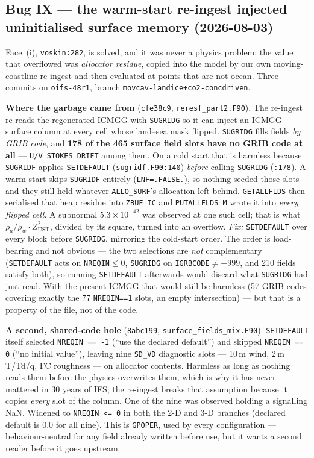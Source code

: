 \documentclass[11pt,a4paper]{article}
\newcommand{\code}[1]{\texttt{\small #1}}
\begin{document}
\subsection{Bug IX --- the warm-start re-ingest injected uninitialised surface memory (2026-08-03)}\label{sec:bug9}

Face~(i), \code{voskin:282}, is solved, and it was never a physics problem: the value that overflowed
was \emph{allocator residue}, copied into the model by our own moving-coastline re-ingest and then
evaluated at points that are not ocean. Three commits on
\code{oifs-48r1}, branch \code{movcav-landice+co2-concdriven}.

\textbf{Where the garbage came from} (\code{cfe38c9}, \code{reresf\_part2.F90}). The re-ingest re-reads
the regenerated ICMGG with \code{SUGRIDG} so it can inject an ICMGG surface column at every cell whose
land--sea mask flipped. \code{SUGRIDG} fills fields \emph{by GRIB code}, and \textbf{178 of the 465
surface field slots have no GRIB code at all} --- \code{U/V\_STOKES\_DRIFT} among them. On a cold start
that is harmless because \code{SUGRIDF} applies \code{SETDEFAULT} (\code{sugridf.F90:140}) \emph{before}
calling \code{SUGRIDG} (\code{:178}). A warm start skips \code{SUGRIDF} entirely (\code{LNF=.FALSE.}), so
nothing seeded those slots and they still held whatever \code{ALLO\_SURF}'s allocation left behind.
\code{GETALLFLDS} then serialised that heap residue into \code{ZBUF\_IC} and \code{PUTALLFLDS\_M} wrote
it into \emph{every flipped cell}. A subnormal $5.3\times10^{-42}$ was observed at one such cell; that
is what $\rho_a/\rho_w\cdot Z_\mathrm{UST}^2$, divided by its square, turned into an overflow. \emph{Fix:}
\code{SETDEFAULT} over every block before \code{SUGRIDG}, mirroring the cold-start order. The order is
load-bearing and not obvious --- the two selections are \emph{not} complementary (\code{SETDEFAULT} acts
on \code{NREQIN}$\le0$, \code{SUGRIDG} on \code{IGRBCODE}$\neq-999$, and 210 fields satisfy both), so
running \code{SETDEFAULT} afterwards would discard what \code{SUGRIDG} had just read. With the present
ICMGG that would still be harmless (57 GRIB codes covering exactly the 77 \code{NREQIN==1} slots, an
empty intersection) --- but that is a property of the file, not of the code.

\textbf{A second, shared-code hole} (\code{8abc199}, \code{surface\_fields\_mix.F90}). \code{SETDEFAULT}
itself selected \code{NREQIN == -1} (``use the declared default'') and skipped \code{NREQIN == 0} (``no
initial value''), leaving nine \code{SD\_VD} diagnostic slots --- 10\,m wind, 2\,m T/Td/q, FC roughness
--- on allocator contents. Harmless as long as nothing reads them before the physics overwrites them,
which is why it has never mattered in 30 years of IFS; the re-ingest breaks that assumption because it
copies \emph{every} slot of the column. One of the nine was observed holding a signalling NaN. Widened
to \code{NREQIN <= 0} in both the 2-D and 3-D branches (declared default is 0.0 for all nine). This is
\code{GPOPER}, used by every configuration --- behaviour-neutral for any field already written before
use, but it wants a second reader before it goes upstream.
\end{document}
